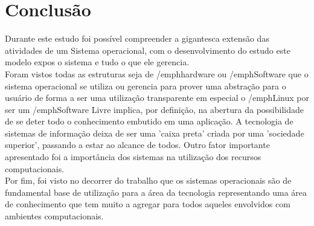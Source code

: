 \chapter*{Conclusão}\label{cap:conclusao}

Durante este estudo foi possível compreender a gigantesca extensão das atividades de um Sistema operacional, com o desenvolvimento do estudo este modelo expos o sistema e tudo o que ele gerencia. \\
Foram vistos todas as estruturas seja de /emph{hardware} ou /emph{Software} que o sistema operacional se utiliza ou gerencia para prover uma abstração para o usuário de forma a ser uma utilização transparente em especial o /emph{Linux} por ser um /emph{Software Livre} implica, por definição, na abertura da possibilidade de se deter todo o conhecimento embutido em uma aplicação. A tecnologia de sistemas de informação deixa de ser uma 'caixa preta' criada por uma 'sociedade superior', passando a estar ao alcance de todos.
Outro fator importante apresentado foi a importância dos sistemas na utilização dos recursos computacionais.\\
Por fim, foi visto no decorrer do trabalho que os sistemas operacionais são de fundamental base de utilização para a área da tecnologia representando uma área de conhecimento que tem muito a agregar para todos aqueles envolvidos com ambientes computacionais.

